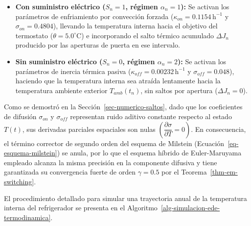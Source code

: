 \documentclass[
  spanish,
  us-letterpaper,
]{scrreprt}
\providecommand{\tightlist}{%
  \setlength{\itemsep}{0pt}\setlength{\parskip}{0pt}}
\numberwithin{equation}{section}
\theoremstyle{plain}
\theoremstyle{plain}
\theoremstyle{definition}
\theoremstyle{plain}
\theoremstyle{remark}
\begin{document}
\begin{itemize}
\tightlist
\item
  \textbf{Con suministro eléctrico (\(S_n = 1\), régimen
  \(\alpha_n = 1\)):} Se activan los parámetros de enfriamiento por
  convección forzada (\(\kappa_{on} = 0.1154\,\text{h}^{-1}\) y
  \(\sigma_{on} = 0.4804\)), llevando la temperatura interna hacia el
  objetivo del termostato (\(\theta = 5.0^\circ\text{C}\)) e
  incorporando el salto térmico acumulado \(\Delta J_n\) producido por
  las aperturas de puerta en ese intervalo.
\item
  \textbf{Sin suministro eléctrico (\(S_n = 0\), régimen
  \(\alpha_n = 2\)):} Se activan los parámetros de inercia térmica
  pasiva (\(\kappa_{off} = 0.00232\,\text{h}^{-1}\) y
  \(\sigma_{off} = 0.048\)), haciendo que la temperatura interna sea
  atraída lentamente hacia la temperatura ambiente exterior
  \(T_{amb}(t_n)\), sin saltos por apertura (\(\Delta J_n = 0\)).
\end{itemize}

Como se demostró en la Sección~\ref{sec-numerico-saltos}, dado que los
coeficientes de difusión \(\sigma_{on}\) y \(\sigma_{off}\) representan
ruido aditivo constante respecto al estado \(T(t)\), sus derivadas
parciales espaciales son nulas
\(\left( \displaystyle \dfrac{\partial \sigma}{\partial T} = 0 \right)\).
En consecuencia, el término corrector de segundo orden del esquema de
Milstein (Ecuación~\ref{eq-esquema-milstein}) se anula, por lo que el
esquema híbrido de Euler-Maruyama empleado alcanza la misma precisión en
la componente difusiva y tiene garantizada su convergencia fuerte de
orden \(\gamma = 0.5\) por el Teorema~\ref{thm-em-switching}.

El procedimiento detallado para simular una trayectoria anual de la
temperatura interna del refrigerador se presenta en el
Algoritmo~\ref{alg-simulacion-ede-termodinamica}.
\end{document}
